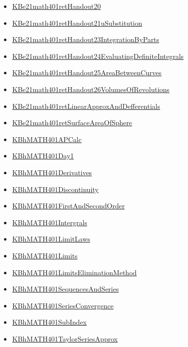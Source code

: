 \documentclass[11pt]{article}
\begin{document}
\begin{itemize}
\begin{itemize}
\item \href{math401/KBe21math401retHandout20.org}{KBe21math401retHandout20}
\item \href{math401/KBe21math401retHandout21uSubstitution.org}{KBe21math401retHandout21uSubstitution}
\item \href{math401/KBe21math401retHandout23IntegrationByParts.org}{KBe21math401retHandout23IntegrationByParts}
\item \href{math401/KBe21math401retHandout24EvaluatingDefiniteIntegrals.org}{KBe21math401retHandout24EvaluatingDefiniteIntegrals}
\item \href{math401/KBe21math401retHandout25AreaBetweenCurves.org}{KBe21math401retHandout25AreaBetweenCurves}
\item \href{math401/KBe21math401retHandout26VolumesOfRevolutions.org}{KBe21math401retHandout26VolumesOfRevolutions}
\item \href{math401/KBe21math401retLinearApproxAndDefferentials.org}{KBe21math401retLinearApproxAndDefferentials}
\item \href{math401/KBe21math401retSurfaceAreaOfSphere.org}{KBe21math401retSurfaceAreaOfSphere}
\item \href{math401/KBhMATH401APCalc.org}{KBhMATH401APCalc}
\item \href{math401/KBhMATH401Day1.org}{KBhMATH401Day1}
\item \href{math401/KBhMATH401Derivatives.org}{KBhMATH401Derivatives}
\item \href{math401/KBhMATH401Discontinuity.org}{KBhMATH401Discontinuity}
\item \href{math401/KBhMATH401FirstAndSecondOrder.org}{KBhMATH401FirstAndSecondOrder}
\item \href{math401/KBhMATH401Intergrals.org}{KBhMATH401Intergrals}
\item \href{math401/KBhMATH401LimitLaws.org}{KBhMATH401LimitLaws}
\item \href{math401/KBhMATH401Limits.org}{KBhMATH401Limits}
\item \href{math401/KBhMATH401LimitsEliminationMethod.org}{KBhMATH401LimitsEliminationMethod}
\item \href{math401/KBhMATH401SequencesAndSeries.org}{KBhMATH401SequencesAndSeries}
\item \href{math401/KBhMATH401SeriesConvergence.org}{KBhMATH401SeriesConvergence}
\item \href{math401/KBhMATH401SubIndex.org}{KBhMATH401SubIndex}
\item \href{math401/KBhMATH401TaylorSeriesApprox.org}{KBhMATH401TaylorSeriesApprox}

\end{itemize}
\end{itemize}
\end{document}
